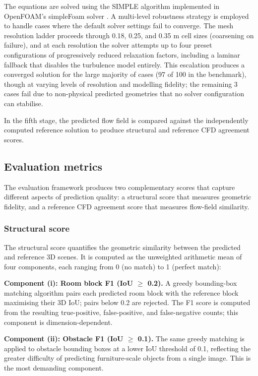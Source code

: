\documentclass[preprint,12pt,number]{elsarticle}
\begin{document}
The equations are solved using the SIMPLE algorithm \cite{patankar.spalding1972CalculationProcedure} implemented in OpenFOAM's simpleFoam solver \cite{weller.etal1998TensorialApproach}. A multi-level robustness strategy is employed to handle cases where the default solver settings fail to converge. The mesh resolution ladder proceeds through 0.18, 0.25, and 0.35 m cell sizes (coarsening on failure), and at each resolution the solver attempts up to four preset configurations of progressively reduced relaxation factors, including a laminar fallback that disables the turbulence model entirely. This escalation produces a converged solution for the large majority of cases (97 of 100 in the benchmark), though at varying levels of resolution and modelling fidelity; the remaining 3 cases fail due to non-physical predicted geometries that no solver configuration can stabilise.

In the fifth stage, the predicted flow field is compared against the independently computed reference solution to produce structural and reference CFD agreement scores.

\subsection{Evaluation metrics}
\label{sec:evaluation-metrics}


The evaluation framework produces two complementary scores that capture different aspects of prediction quality: a structural score that measures geometric fidelity, and a reference CFD agreement score that measures flow-field similarity.

\subsubsection{Structural score}


The structural score quantifies the geometric similarity between the predicted and reference 3D scenes. It is computed as the unweighted arithmetic mean of four components, each ranging from 0 (no match) to 1 (perfect match):

\textbf{Component (i): Room block F1 (IoU $\geq$ 0.2).} A greedy bounding-box matching algorithm pairs each predicted room block with the reference block maximising their 3D IoU; pairs below 0.2 are rejected. The F1 score is computed from the resulting true-positive, false-positive, and false-negative counts; this component is dimension-dependent.

\textbf{Component (ii): Obstacle F1 (IoU $\geq$ 0.1).} The same greedy matching is applied to obstacle bounding boxes at a lower IoU threshold of 0.1, reflecting the greater difficulty of predicting furniture-scale objects from a single image. This is the most demanding component.
\end{document}
